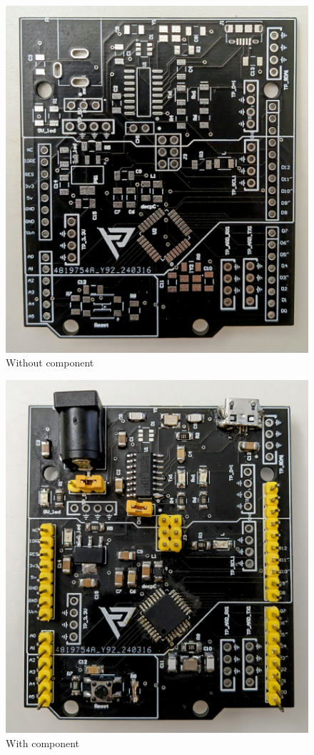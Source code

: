 \documentclass[a4paper,11pt]{article}%
\begin{document}
\begin{figure}[H]
	\centering
	\includegraphics[scale=0.25]{figures/without_component.jpg}
	\caption{Without component}
	\label{top}
\end{figure}

\begin{figure}[H]
	\centering
	\includegraphics[scale=0.2]{figures/with_component.jpg}
	\caption{With component}
\end{figure}
\end{document}
